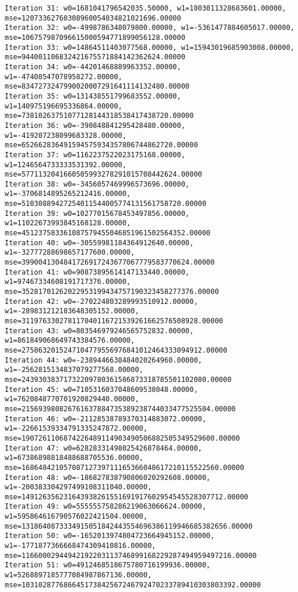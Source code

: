 \documentclass[11pt]{article}
\begin{document}
\begin{Verbatim}[commandchars=\\\{\}]
Iteration 31: w0=1681041796542035.50000, w1=1803011328683601.00000, mse=12073362760308960054034821021696.00000
Iteration 32: w0=-4998786348079800.00000, w1=-5361477884605017.00000, mse=106757987096615000594771899056128.00000
Iteration 33: w0=14864511403077568.00000, w1=15943019685903008.00000, mse=944001106832421675571884142362624.00000
Iteration 34: w0=-44201468889963352.00000, w1=-47408547078958272.00000, mse=8347273247990020007291641114132480.00000
Iteration 35: w0=131438551799683552.00000, w1=140975196695336864.00000, mse=73810263751077128144318538417438720.00000
Iteration 36: w0=-390848841295428480.00000, w1=-419207238099683328.00000, mse=652662836491594575934357806744862720.00000
Iteration 37: w0=1162237522023175168.00000, w1=1246564733333531392.00000, mse=5771132041660505993278291015708442624.00000
Iteration 38: w0=-3456057469996573696.00000, w1=-3706814895265212416.00000, mse=51030889427254011544005774131561758720.00000
Iteration 39: w0=10277015678453497856.00000, w1=11022673993845168128.00000, mse=451237583361087579455046851961502564352.00000
Iteration 40: w0=-30559981184364912640.00000, w1=-32777288698657177600.00000, mse=3990041304841726917243677067779583770624.00000
Iteration 41: w0=90873895614147133440.00000, w1=97467334608191717376.00000, mse=35281701262022953199434757190323458277376.00000
Iteration 42: w0=-270224803289993510912.00000, w1=-289831212183648305152.00000, mse=311976330278117040116721539261662576508928.00000
Iteration 43: w0=803546979246565752832.00000, w1=861849068649743384576.00000, mse=2758632015247104779556976841012464333094912.00000
Iteration 44: w0=-2389446638484020264960.00000, w1=-2562815134837079277568.00000, mse=24393038371732209780361586873318785501102080.00000
Iteration 45: w0=7105316037048609538048.00000, w1=7620848770701920829440.00000, mse=215693980826761637884735389238744033477525504.00000
Iteration 46: w0=-21128538789370314883072.00000, w1=-22661539334791335247872.00000, mse=1907261106874226489114903490506882505349529600.00000
Iteration 47: w0=62828331498025426878464.00000, w1=67386898818488688705536.00000, mse=16864842105708712739711165366048617210115522560.00000
Iteration 48: w0=-186827838790806020292608.00000, w1=-200383304297499108311040.00000, mse=149126356231643938261551691917602954545528307712.00000
Iteration 49: w0=555555758286219063066624.00000, w1=595864616790576022421504.00000, mse=1318640873334915051842443554696386119946685382656.00000
Iteration 50: w0=-1652013974804723664945152.00000, w1=-1771877366668474309410816.00000, mse=11660002944942192203113746899168229287494959497216.00000
Iteration 51: w0=4912468518675780716199936.00000, w1=5268897185777084987867136.00000, mse=103102877686645173842567246792470233789410303803392.00000

\end{Verbatim}
\end{document}
